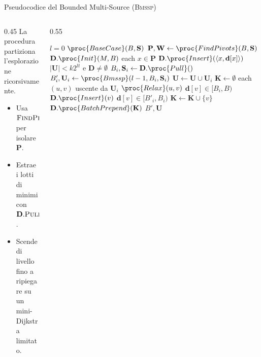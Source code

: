 \documentclass[aspectratio=169]{beamer}
\begin{document}
\begin{frame}[fragile]{Pseudocodice del Bounded Multi-Source (\textsc{Bmssp})}
    \begin{columns}
        \begin{column}{0.45\textwidth}
            La procedura partiziona l'esplorazione ricorsivamente.
            \vspace{0.2cm}
            \begin{itemize}
                \item Usa $\textsc{FindPivots}$ per isolare $\mathbf{P}$.
                \item Estrae i lotti di minimi con $\mathbf{D}.\textsc{Pull}()$.
                \item Scende di livello fino a ripiegare su un mini-Dijkstra limitato.
            \end{itemize}
        \end{column}
        \begin{column}{0.55\textwidth}
                \vspace{-0.3cm}

            \scriptsize
            \begin{codebox}
            \li \If $l = 0$ 
            \li \Then \Return $\proc{BaseCase}(B, \mathbf{S})$ \End
            \li $\mathbf{P}, \mathbf{W} \gets \proc{FindPivots}(B, \mathbf{S})$
            \li $\mathbf{D}.\proc{Init}(M, B)$
            \li \For each $x \in \mathbf{P}$ 
            \li \Do $\mathbf{D}.\proc{Insert}(\langle x, \mathbf{d}[x] \rangle)$ \End
            \li \While $|\mathbf{U}| < k 2^{lt}$ e $\mathbf{D} \neq \emptyset$ \Do
            \li   $B_i, \mathbf{S}_i \gets \mathbf{D}.\proc{Pull}()$
            \li   $B'_i, \mathbf{U}_i \gets \proc{Bmssp}(l-1, B_i, \mathbf{S}_i)$
            \li   $\mathbf{U} \gets \mathbf{U} \cup \mathbf{U}_i$
            \li   $\mathbf{K} \gets \emptyset$
            \li   \For each $(u,v)$ uscente da $\mathbf{U}_i$ \Do
            \li       \If $\proc{Relax}(u, v)$ \Then
            \li           \If $\mathbf{d}[v] \in [B_i, B)$ 
            \li \Then $\mathbf{D}.\proc{Insert}(v)$
            \li           \ElseIf $\mathbf{d}[v] \in [B'_i, B_i)$ 
            \li \Then $\mathbf{K} \gets \mathbf{K} \cup \{v\}$
                          \End
                      \End
                  \End
            \li   $\mathbf{D}.\proc{BatchPrepend}(\mathbf{K})$
                \End
            \li \Return $B', \mathbf{U}$
            \end{codebox}
        \end{column}
    \end{columns}
\end{frame}
\end{document}
